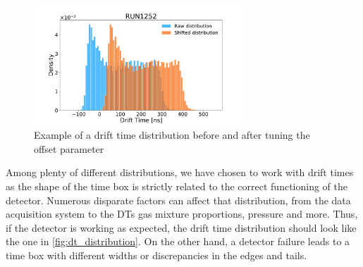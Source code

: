 \begin{figure}[h]
    \centering
    \includegraphics[width=0.7\textwidth]{./Images/experiment/RUN1252_both.pdf}
    \caption{Example of a drift time distribution before and after tuning the offset parameter}
    \label{fig:dt_distribution}
\end{figure}

Among plenty of different distributions, we have chosen to work with drift times as the shape of the time box is
strictly related to the correct functioning of the detector. Numerous disparate factors can affect that distribution,
from the data acquisition system to the DTs gas mixture proportions, pressure and more. Thus, if the detector is working
as expected, the drift time distribution should look like the one in \autoref{fig:dt_distribution}. On the other hand, a
detector failure leads to a time box with different widths or discrepancies in the edges and tails.


